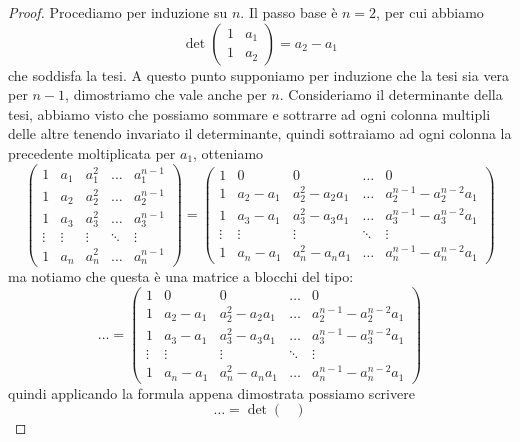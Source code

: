 \documentclass[11pt]{scrartcl}
\begin{document}
   	 \begin{proof}
   	 	Procediamo per induzione su $n$. Il passo base è $n=2$, per cui abbiamo
   	 	$$\det\begin{pmatrix}
   	 		1 & a_1 \\
   	 		1 & a_2 
   	 	\end{pmatrix}=a_2-a_1$$
   	 	che soddisfa la tesi. A questo punto supponiamo per induzione che la tesi sia vera per $n-1$, dimostriamo che vale anche per $n$. Consideriamo il determinante della tesi, abbiamo visto che possiamo sommare e sottrarre ad ogni colonna multipli delle altre tenendo invariato il determinante, quindi sottraiamo ad ogni colonna la precedente moltiplicata per $a_1$, otteniamo
   	 	$$\begin{pmatrix}
   	 		1 & a_1 & a_1^2 & \dots & a_1^{n-1} \\
   	 		1 & a_2 & a_2^2 & \dots & a_2^{n-1} \\
   	 		1 & a_3 & a_3^2 & \dots & a_3^{n-1} \\
   	 		\vdots & \vdots & \vdots & \ddots & \vdots \\
   	 		1 & a_n & a_n^2 & \dots & a_n^{n-1}
   	 	\end{pmatrix}=\begin{pmatrix}
   	 	1 & 0 & 0 & \dots & 0 \\
   	 	1 & a_2-a_1 & a_2^2-a_2a_1 & \dots & a_2^{n-1}-a_2^{n-2}a_1 \\
   	 	1 & a_3-a_1 & a_3^2-a_3a_1 & \dots & a_3^{n-1}-a_3^{n-2}a_1 \\
   	 	\vdots & \vdots & \vdots & \ddots & \vdots \\
   	 	1 & a_n-a_1 & a_n^2-a_na_1 & \dots & a_n^{n-1}-a_n^{n-2}a_1
   	 	\end{pmatrix}$$
   	 	ma notiamo che questa è una matrice a blocchi del tipo:
   	 	$$\dots=\left(\begin{array}{c|cccc}
   	 		1 & 0 & 0 & \dots & 0 \\
   	 		\hline
   	 		1 & a_2-a_1 & a_2^2-a_2a_1 & \dots & a_2^{n-1}-a_2^{n-2}a_1 \\
   	 		1 & a_3-a_1 & a_3^2-a_3a_1 & \dots & a_3^{n-1}-a_3^{n-2}a_1 \\
   	 		\vdots & \vdots & \vdots & \ddots & \vdots \\
   	 		1 & a_n-a_1 & a_n^2-a_na_1 & \dots & a_n^{n-1}-a_n^{n-2}a_1
   	 	\end{array}\right)$$
   	 	quindi applicando la formula appena dimostrata possiamo scrivere
   	 	$$\dots=\det\begin{pmatrix}

\end{pmatrix}$$
\end{proof}
\end{document}
